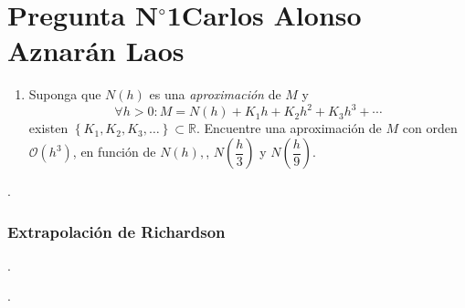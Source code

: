 \section{Pregunta N$^{\circ}$1\qquad Carlos Alonso Aznarán Laos}

\begin{frame}
    \begin{enumerate}\setcounter{enumi}{0}
        \item

              Suponga que $N\left(h\right)$ es una \emph{aproximación}
              de $M$ y
              \begin{equation*}
                  \forall h>0:
                  M=
                  N\left(h\right)+
                  K_{1}h+
                  K_{2}h^{2}+
                  K_{3}h^{3}+
                  \cdots
              \end{equation*}
              existen
              \begin{math}
                  \left\{
                  K_{1},
                  K_{2},
                  K_{3},
                  \dotsc
                  \right\}\subset
                  \mathbb{R}
              \end{math}.
              Encuentre una aproximación de $M$ con orden
              $\mathcal{O}\left(h^3\right)$, en función de
              \begin{math}
                  N\left(h\right),
              \end{math},
              \begin{math}
                  N\left(\dfrac{h}{3}\right)
              \end{math}
              y
              \begin{math}
                  N\left(\dfrac{h}{9}\right)
              \end{math}.
    \end{enumerate}

    \begin{solution}
        .
    \end{solution}
\end{frame}

\begin{frame}
    \frametitle{Extrapolación de Richardson}

    .
\end{frame}

\begin{frame}
    \begin{solution}
        .
    \end{solution}
\end{frame}